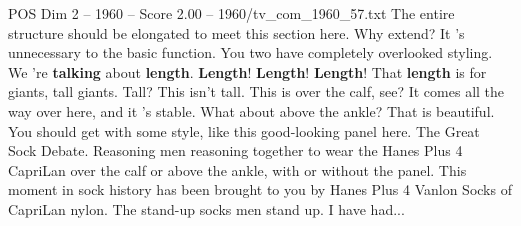 \begin{textsample}{POS Dim 2 – 1960 – Score 2.00 – 1960/tv\_com\_1960\_57.txt}  \label{ex:f2_pos_028}
The entire structure should be elongated to meet this section here.
Why extend?
It 's unnecessary to the basic function.
You two have completely overlooked styling.
We 're \textbf{talking} about \textbf{length}. \textbf{Length}! \textbf{Length}! \textbf{Length}!
That \textbf{length} is for giants, tall giants.
Tall?
This isn't tall.
This is over the calf, see?
It comes all the way over here, and it 's stable.
What about above the ankle?
That is beautiful.
You should get with some style, like this good-looking panel here.
The Great Sock Debate.
Reasoning men reasoning together to wear the Hanes Plus 4 CapriLan over the calf or above the ankle, with or without the panel.
This moment in sock history has been brought to you by Hanes Plus 4 Vanlon Socks of CapriLan nylon.
The stand-up socks men stand up.
I have had...

\end{textsample}
